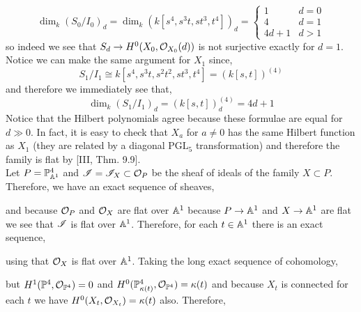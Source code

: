 \documentclass[12pt]{article}
\begin{document}
\[ \dim_{k} (S_0 / I_0)_d = \dim_k (k[s^4, s^3 t, s t^3, t^4])_d = 
\begin{cases}
1 & d = 0
\\
4 & d = 1
\\
4 d + 1 & d > 1
\end{cases} \]
so indeed we see that $S_d \to H^0(X_0, \mathcal{O}_{X_0}(d))$ is not surjective exactly for $d = 1$. Notice we can make the same argument for $X_1$ since,
\[ S_1 / I_1 \cong k[s^4, s^3 t, s^2 t^2, s t^3, t^4] = (k[s,t])^{(4)} \]
and therefore we immediately see that,
\[ \dim_k (S_1 / I_1)_d = (k[s,t])^{(4)}_d = 4d + 1 \]
Notice that the Hilbert polynomials agree because these formulae are equal for $d \gg 0$. In fact, it is easy to check that $X_a$ for $a \neq 0$ has the same Hilbert function as $X_1$ (they are related by a diagonal $\mathrm{PGL}_5$ transformation) and therefore the family is flat by [III, Thm. 9.9].
\bigskip\\
Let $P = \mathbb{P}^4_{\mathbb{A}^1}$ and $\mathscr{I} = \mathscr{I}_X \subset \mathcal{O}_{P}$ be the sheaf of ideals of the family $X \subset P$. Therefore, we have an exact sequence of sheaves,
\begin{center}
\end{center}
and because $\mathcal{O}_{P}$ and $\mathcal{O}_{X}$ are flat over $\mathbb{A}^1$ because $P \to \mathbb{A}^1$ and $X \to \mathbb{A}^1$ are flat we see that $\mathscr{I}$ is flat over $\mathbb{A}^1$. Therefore, for each $t \in \mathbb{A}^1$ there is an exact sequence,
\begin{center}
\end{center}
using that $\mathcal{O}_{X}$ is flat over $\mathbb{A}^1$. Taking the long exact sequence of cohomology,
\begin{center}
\end{center}
but $H^1(\mathbb{P}^4, \mathcal{O}_{\mathbb{P}^4}) = 0$ and $H^0(\mathbb{P}^4_{\kappa(t)}, \mathcal{O}_{\mathbb{P}^4}) = \kappa(t)$ and because $X_t$ is connected for each $t$ we have $H^0(X_t, \mathcal{O}_{X_t}) = \kappa(t)$ also. Therefore,
\end{document}
